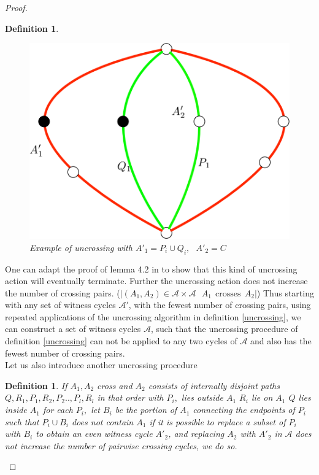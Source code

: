 \documentclass[letterpaper,11pt]{article}
\newtheorem{definition}[theorem]{Definition}
\newcommand{\0}{\mathbb{0}}
\newcommand{\1}{\mathbb{1}}
\begin{document}
\begin{proof}
\begin{definition}
\begin{figure}
\includegraphics[scale=0.25]{Uncrossed2.png} 
\caption{ Example of uncrossing  with   $ A'_1=P_i \cup Q_i ,   \ \ \ A'_2=C$  } 
\label{defcross2}
\end{figure}
\end{definition}   
One can adapt the proof of lemma 4.2 in \cite{GW98} to show  that this kind of uncrossing action will eventually terminate. 
Further the uncrossing action does not increase the number of crossing pairs. ($ | (A_1, A_2) \in \mathcal{A} \times  \mathcal{A}   \ \ \ A_1 \ \ \text{crosses} \ \ A_2   |  $)
Thus starting with any set of witness cycles $\mathcal{A}'$, with the fewest number of crossing pairs,  using repeated applications of the uncrossing algorithm in definition \ref{uncrossing}, we can construct a set of witness cycles $ \mathcal{A} $, such that the uncrossing procedure of definition \ref{uncrossing}  can not be applied to any two cycles of $\mathcal{A}$ and also has the fewest number of crossing pairs. \\
Let us also introduce another uncrossing procedure 
\begin{definition}\label{uncrossing2}
If  $A_1, A_2$ cross and  $A_2$ consists of internally disjoint paths $Q,   R_1, P_1, R_2, P_2 ..,  P_l, R_l$  in that order with  $P_i,$  lies outside $A_1$  $ R_i$ lie on $A_1$ $Q$ lies inside $A_1$ for each $P_i,$ let  $B_i$ be the portion of $A_1$ connecting the endpoints of $P_i$ such that $P_i \cup B_i$ does not contain $A_1$ if it is possible to replace a subset of $P_i$ with $B_i$ to obtain an even witness cycle $A'_2$, and replacing $A_2$ with $A'_2$ in $\mathcal{A} $  does not increase the number of pairwise crossing cycles,  we do so. 

\end{definition}
\end{proof}
\end{document}
